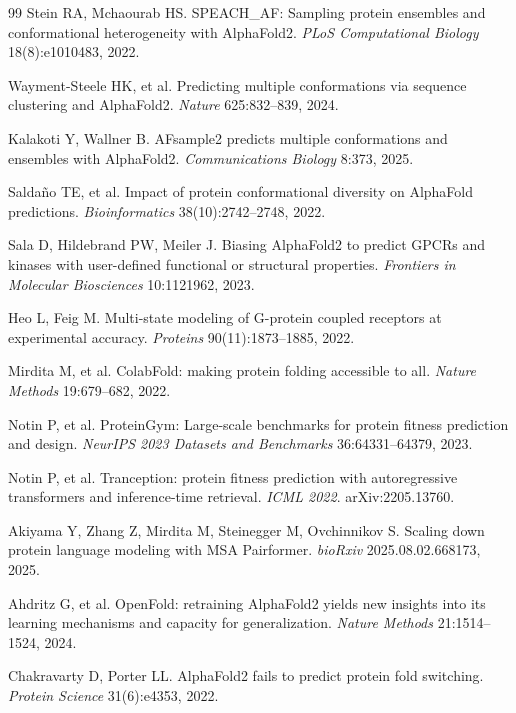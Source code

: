 \documentclass[11pt]{article}
\begin{document}
\begin{thebibliography}{99}
Stein RA, Mchaourab HS.
\newblock SPEACH\_AF: Sampling protein ensembles and conformational
heterogeneity with AlphaFold2.
\newblock \emph{PLoS Computational Biology} 18(8):e1010483, 2022.

Wayment-Steele HK, et al.
\newblock Predicting multiple conformations via sequence clustering and
AlphaFold2.
\newblock \emph{Nature} 625:832--839, 2024.

Kalakoti Y, Wallner B.
\newblock AFsample2 predicts multiple conformations and ensembles with
AlphaFold2.
\newblock \emph{Communications Biology} 8:373, 2025.

Salda{\~n}o TE, et al.
\newblock Impact of protein conformational diversity on AlphaFold predictions.
\newblock \emph{Bioinformatics} 38(10):2742--2748, 2022.

Sala D, Hildebrand PW, Meiler J.
\newblock Biasing AlphaFold2 to predict GPCRs and kinases with user-defined
functional or structural properties.
\newblock \emph{Frontiers in Molecular Biosciences} 10:1121962, 2023.

Heo L, Feig M.
\newblock Multi-state modeling of G-protein coupled receptors at experimental
accuracy.
\newblock \emph{Proteins} 90(11):1873--1885, 2022.

Mirdita M, et al.
\newblock ColabFold: making protein folding accessible to all.
\newblock \emph{Nature Methods} 19:679--682, 2022.

Notin P, et al.
\newblock ProteinGym: Large-scale benchmarks for protein fitness prediction and
design.
\newblock \emph{NeurIPS 2023 Datasets and Benchmarks} 36:64331--64379, 2023.

Notin P, et al.
\newblock Tranception: protein fitness prediction with autoregressive
transformers and inference-time retrieval.
\newblock \emph{ICML 2022}. arXiv:2205.13760.

Akiyama Y, Zhang Z, Mirdita M, Steinegger M, Ovchinnikov S.
\newblock Scaling down protein language modeling with MSA Pairformer.
\newblock \emph{bioRxiv} 2025.08.02.668173, 2025.

Ahdritz G, et al.
\newblock OpenFold: retraining AlphaFold2 yields new insights into its learning
mechanisms and capacity for generalization.
\newblock \emph{Nature Methods} 21:1514--1524, 2024.

Chakravarty D, Porter LL.
\newblock AlphaFold2 fails to predict protein fold switching.
\newblock \emph{Protein Science} 31(6):e4353, 2022.


\end{thebibliography}
\end{document}
